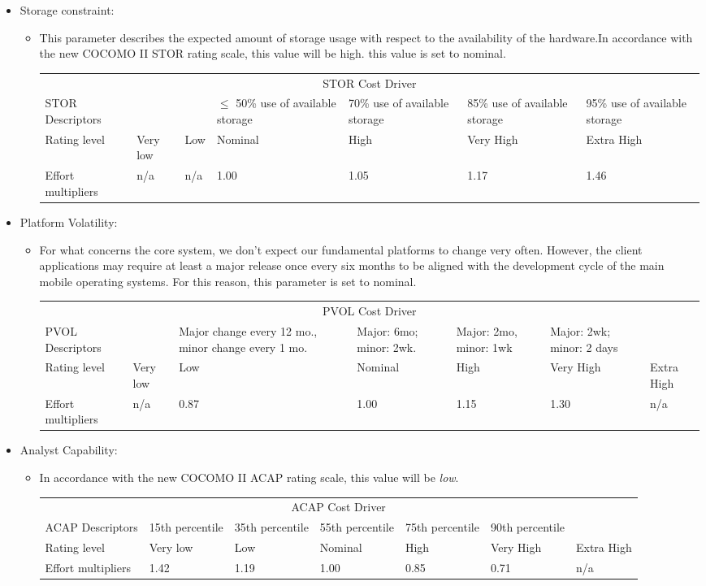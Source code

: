 \documentclass[english]{article}
\newenvironment{costdriverstable}[1]{
	\setlength{\LTleft}{-40pt}
	\begin{longtable}{|p{\dimexpr.16\textwidth}|p{\dimexpr.14\textwidth}|p{\dimexpr.14\textwidth}|p{\dimexpr.14\textwidth}|p{\dimexpr.14\textwidth}|p{\dimexpr.14\textwidth}|p{\dimexpr.14\textwidth}|}
	\hline
	\multicolumn{7}{|c|}{{#1}}\\\hhline{|=======|}
}{
	\hline\end{longtable}
}
\newcommand{\costdescriptors}[7]{
	#1 & #2 & #3 & #4 & #5 & #6 & #7\\
}
\newcommand{\ratinglevel}[6]{
	Rating level & #1 & #2 & #3 & #4 & #5 & #6 \\\hline
}
\newcommand{\effortmultipliers}[6]{
	Effort multipliers & #1 & #2 & #3 & #4 & #5 & #6 \\\hline
}
\begin{document}
\begin{itemize}
	\item Storage constraint: 
	\begin{itemize}
	\item[] This parameter describes the expected amount of storage usage with respect to the availability of the hardware.In accordance with the new COCOMO II STOR rating scale, this value will be high. this value is set to nominal.
	\begin{costdriverstable}{STOR Cost Driver}
		\costdescriptors{STOR Descriptors}{}{}{$\le$  50\% use of available storage}{70\% use of available storage}{85\% use of available storage} {95\% use of available storage}\hline
		\ratinglevel{Very low}{Low}{Nominal}{High}{Very High}{Extra High}
		\effortmultipliers{n/a}{n/a}{1.00}{1.05}{1.17}{1.46}	
	\end{costdriverstable}
	\end{itemize}
\end{itemize}

\begin{itemize}
	\item Platform Volatility: 
	\begin{itemize}
	\item[] For what concerns the core system, we don't expect our fundamental platforms to change very often. However, the client applications may require at least a major release once every six months to be aligned with the development cycle of the main mobile operating systems. For this reason, this parameter is set to nominal.
	\begin{costdriverstable}{PVOL Cost Driver}
		\costdescriptors{PVOL Descriptors}{}{Major change every 12 mo., minor change every 1 mo.}{Major: 6mo; minor: 2wk.}{Major: 2mo, minor: 1wk}	{Major: 2wk; minor: 2 days}{}\hline
		\ratinglevel{Very low}{Low}{Nominal}{High}{Very High}{Extra High}
		\effortmultipliers{n/a}{0.87}{1.00}{1.15}{1.30}{n/a}
	\end{costdriverstable}
	\end{itemize}
\end{itemize}

\begin{itemize}
	\item Analyst Capability: 
	\begin{itemize}
	\item[] In accordance with the new COCOMO II ACAP rating scale, this value will be \textit{low}.
	\begin{costdriverstable}{ACAP Cost Driver}
		\costdescriptors{ACAP Descriptors}{15th percentile}{35th percentile}{55th percentile}{75th percentile}{90th percentile}{}\hline
		\ratinglevel{Very low}{Low}{Nominal}{High}{Very High}{Extra High}
		\effortmultipliers{1.42}{1.19}{1.00}{0.85}{0.71}{n/a}	
	\end{costdriverstable}
	\end{itemize}
\end{itemize}
\end{document}
